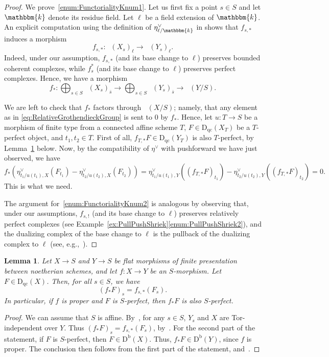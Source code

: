 \documentclass[11pt, reqno]{amsart}
\numberwithin{equation}{section}
\theoremstyle{plain}
\newtheorem{lemma}[theorem]{Lemma}
\theoremstyle{remark}
\theoremstyle{definition}
\theoremstyle{italicsname}
\newcommand{\Db}{\mathrm{D^b}}
\newcommand{\Dqc}{\mathrm{D}_{\mathrm{qc}}}
\newcommand{\num}{\mathrm{num}}
\DeclareMathOperator{\Knum}{\rK_{\num}}
\newcommand{\rK}{\mathrm{K}}
\newcommand{\KK}{\mathbbm{k}}
\def\citestacks#1{\cite[\href{https://stacks.math.columbia.edu/tag/#1}{#1}]{stacks-project}}
\begin{document}
\begin{proof}
We prove~\ref{enum:FunctorialityKnum1}.
Let us first fix a point $s\in S$ and let $\KK$ denote its residue field.
Let $\ell$ be a field extension of $\KK$.
An explicit computation using the definition of $\eta^\vee_{\ell/\KK}$ in \cite[(12.2)]{stability-families} shows that $f_{s,*}$ induces a morphism
\[
f_{s,*}\colon\Knum(X_s)_\ell\longrightarrow\Knum(Y_s)_\ell.
\]
Indeed, under our assumption, $f_{s,*}$ (and its base change to $\ell$) preserves bounded coherent complexes, while $f^*_s$ (and its base change to $\ell$) preserves perfect complexes.
Hence, we have a morphism
\[
f_*\colon\bigoplus_{s\in S}\Knum(X_s)_{\overline{s}}\longrightarrow\bigoplus_{s\in S}\Knum(Y_s)_{\overline{s}}\longrightarrow\Knum(Y/S).
\]

We are left to check that $f_*$ factors through $\Knum(X/S)$; namely,  that any element as in \eqref{eq:RelativeGrothendieckGroup} is sent to $0$ by $f_*$.
Hence, let $u\colon T\to S$ be a morphism of finite type from a connected affine scheme $T$, $F\in\Dqc(X_T)$ be a $T$-perfect object, and $t_1,t_2\in T$.
First of all, $f_{T,*}F\in\Dqc(Y_T)$ is also $T$-perfect, by Lemma~\ref{lem:PushforwardTperfect} below.
Now, by the compatibility of $\eta^\vee$ with pushforward we have just observed, we have
\[
f_*\left(\eta^{\vee}_{t_1/u(t_1),X}(F_{t_1})-\eta^{\vee}_{t_2/u(t_2),X}(F_{t_2})\right)=\eta^{\vee}_{t_1/u(t_1),Y}((f_{T,*}F)_{t_1})-\eta^{\vee}_{t_2/u(t_2),Y}((f_{T,*}F)_{t_2})=0.
\]
This is what we need.

The argument for~\ref{enum:FunctorialityKnum2} is analogous by observing that, under our assumptions, $f_{s,!}$ (and its base change to $\ell$) preserves relatively perfect complexes (see Example~\ref{ex:PullPushShriek}\ref{enum:PullPushShriek2}), and the dualizing complex of the base change to $\ell$ is the pullback of the dualizing complex to $\ell$ (see, e.g.,~\cite[Theorem 2.7]{LN}).
\end{proof}

\begin{lemma}\label{lem:PushforwardTperfect}
Let $X\to S$ and $Y\to S$ be flat morphisms of finite presentation between noetherian schemes, and let $f\colon X\to Y$ be an $S$-morphism.
Let $F\in\Dqc(X)$.
Then, for all $s\in S$, we have
\[
(f_*F)_s=f_{s,*}(F_s).
\]
In particular, if $f$ is proper and $F$ is $S$-perfect, then $f_*F$ is also $S$-perfect.
\end{lemma}

\begin{proof}
We can assume that $S$ is affine.
By~\citestacks{0CTA}, for any $s \in S$, $Y_s$ and $X$ are Tor-independent over $Y$. 
Thus $(f_*F)_s=f_{s,*}(F_s)$, by~\citestacks{08IB}.
For the second part of the statement, if $F$ is $S$-perfect, then $F\in\Db(X)$.
Thus, $f_*F\in\Db(Y)$, since $f$ is proper. 
The conclusion then follows from the first part of the statement, and~\citestacks{0GEH}.
\end{proof}
\end{document}
